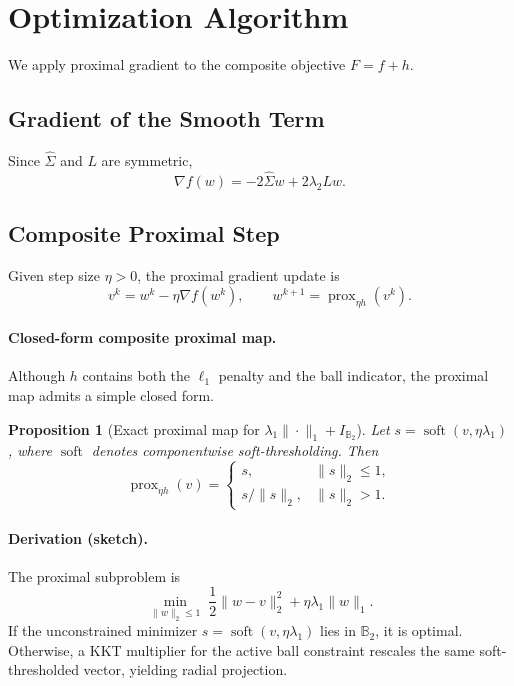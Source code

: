 \documentclass[10pt,twocolumn,letterpaper]{article}
\newtheorem{proposition}{Proposition}
\theoremstyle{definition}
\newcommand{\Sigmahat}{\widehat{\Sigma}}
\DeclareMathOperator{\prox}{prox}
\DeclareMathOperator{\soft}{soft}
\begin{document}
\section{Optimization Algorithm}
We apply proximal gradient to the composite objective $F=f+h$.

\subsection{Gradient of the Smooth Term}
Since $\Sigmahat$ and $L$ are symmetric,
\begin{equation}
\nabla f(w) = -2\Sigmahat w + 2\lambda_2 L w.
\end{equation}

\subsection{Composite Proximal Step}
Given step size $\eta>0$, the proximal gradient update is
\begin{equation}
  v^k = w^k - \eta \nabla f(w^k), \qquad
  w^{k+1} = \prox_{\eta h}(v^k).
\end{equation}

\paragraph{Closed-form composite proximal map.}
Although $h$ contains both the $\ell_1$ penalty and the ball indicator, the proximal map admits a simple closed form.
\begin{proposition}[Exact proximal map for $\lambda_1\|\cdot\|_1+I_{\mathbb{B}_2}$]
\label{prop:prox-composition}
Let $s=\soft(v,\eta\lambda_1)$, where $\soft$ denotes componentwise soft-thresholding. Then
\begin{equation}
\prox_{\eta h}(v)=
\begin{cases}
s, & \|s\|_2\le 1,\\
s/\|s\|_2, & \|s\|_2>1.
\end{cases}
\end{equation}
\end{proposition}

\paragraph{Derivation (sketch).}
The proximal subproblem is
\begin{equation}
\min_{\|w\|_2\le 1}\; \frac12\|w-v\|_2^2+\eta\lambda_1\|w\|_1.
\end{equation}
If the unconstrained minimizer $s=\soft(v,\eta\lambda_1)$ lies in $\mathbb{B}_2$, it is optimal. Otherwise, a KKT multiplier for the active ball constraint rescales the same soft-thresholded vector, yielding radial projection.
\end{document}
